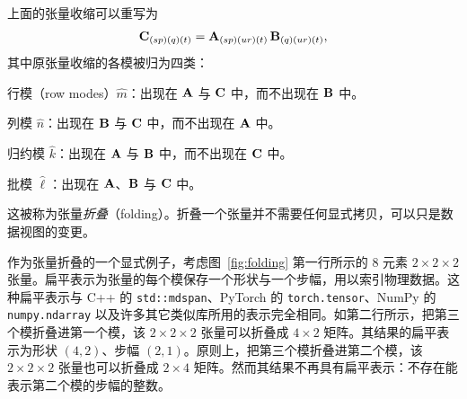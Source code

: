 上面的张量收缩可以重写为
\begin{align*}
\mathbf{C}_{(sp)(q)(t)} = \mathbf{A}_{(sp)(ur)(t)} \, \mathbf{B}_{(q)(ur)(t)},
\end{align*}
其中原张量收缩的各模被归为四类：
\begin{compactitem}
\item 行模（row modes）$\hat{m}$：出现在 $\mathbf{A}$ 与 $\mathbf{C}$ 中，而不出现在 $\mathbf{B}$ 中。
\item 列模 $\hat{n}$：出现在 $\mathbf{B}$ 与 $\mathbf{C}$ 中，而不出现在 $\mathbf{A}$ 中。
\item 归约模 $\hat{k}$：出现在 $\mathbf{A}$ 与 $\mathbf{B}$ 中，而不出现在 $\mathbf{C}$ 中。
\item 批模 $\hat{\ell}$：出现在 $\mathbf{A}$、$\mathbf{B}$ 与 $\mathbf{C}$ 中。
\end{compactitem}
这被称为张量{\em 折叠}（folding）。折叠一个张量并不需要任何显式拷贝，可以只是数据视图的变更。

作为张量折叠的一个显式例子，考虑图~\ref{fig:folding} 第一行所示的 8 元素 $2 {\times} 2 {\times} 2$ 张量。扁平表示为张量的每个模保存一个形状与一个步幅，用以索引物理数据。这种扁平表示与 C++ 的 {\tt std::mdspan}、PyTorch 的 {\tt torch.tensor}、NumPy 的 {\tt numpy.ndarray} 以及许多其它类似库所用的表示完全相同。如第二行所示，把第三个模折叠进第一个模，该 $2 {\times} 2 {\times} 2$ 张量可以折叠成 $4 {\times} 2$ 矩阵。其结果的扁平表示为形状 $(4,2)$、步幅 $(2,1)$。原则上，把第三个模折叠进第二个模，该 $2 {\times} 2 {\times} 2$ 张量也可以折叠成 $2 {\times} 4$ 矩阵。然而其结果不再具有扁平表示：不存在能表示第二个模的步幅的整数。

